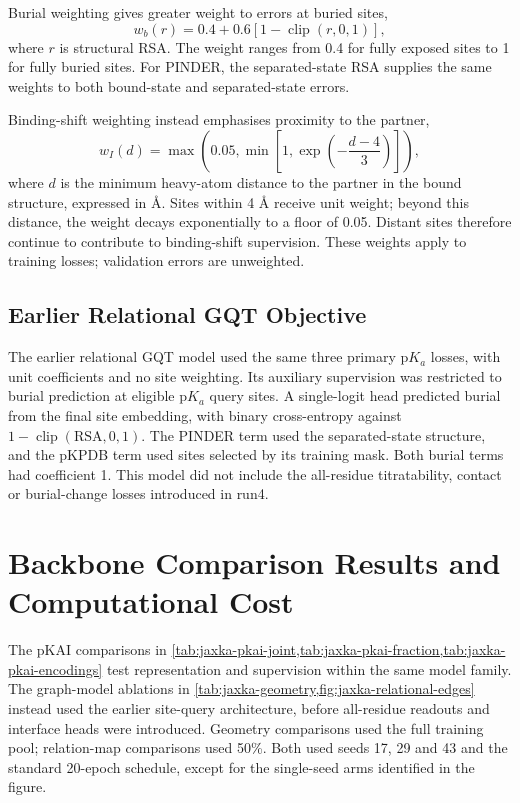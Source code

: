 Burial weighting gives greater weight to errors at buried sites,
\begin{equation}
    w_b(r)=0.4+0.6\left[1-\operatorname{clip}(r,0,1)\right],
    \label{eq:jaxka-pkai-burial-weight}
\end{equation}
where $r$ is structural RSA. The weight ranges from 0.4 for fully exposed sites to 1 for fully buried sites. For PINDER, the separated-state RSA supplies the same weights to both bound-state and separated-state errors.

Binding-shift weighting instead emphasises proximity to the partner,
\begin{equation}
    w_I(d)=\max\!\left(0.05,
    \min\!\left[1,\exp\!\left(-\frac{d-4}{3}\right)\right]\right),
    \label{eq:jaxka-pkai-interface-weight}
\end{equation}
where $d$ is the minimum heavy-atom distance to the partner in the bound structure, expressed in \AA{}. Sites within 4 \AA{} receive unit weight; beyond this distance, the weight decays exponentially to a floor of 0.05. Distant sites therefore continue to contribute to binding-shift supervision. These weights apply to training losses; validation errors are unweighted.

\subsection{Earlier Relational GQT Objective}
\label{app:jaxka-relational-objective}

The earlier relational GQT model used the same three primary $\mathrm{p}K_a$ losses, with unit coefficients and no site weighting. Its auxiliary supervision was restricted to burial prediction at eligible $\mathrm{p}K_a$ query sites. A single-logit head predicted burial from the final site embedding, with binary cross-entropy against $1-\operatorname{clip}(\mathrm{RSA},0,1)$. The PINDER term used the separated-state structure, and the pKPDB term used sites selected by its training mask. Both burial terms had coefficient 1. This model did not include the all-residue titratability, contact or burial-change losses introduced in run4.

\section{Backbone Comparison Results and Computational Cost}
\label{app:jaxka-backbone-comparisons}

The pKAI comparisons in \cref{tab:jaxka-pkai-joint,tab:jaxka-pkai-fraction,tab:jaxka-pkai-encodings} test representation and supervision within the same model family. The graph-model ablations in \cref{tab:jaxka-geometry,fig:jaxka-relational-edges} instead used the earlier site-query architecture, before all-residue readouts and interface heads were introduced. Geometry comparisons used the full training pool; relation-map comparisons used 50\%. Both used seeds 17, 29 and 43 and the standard 20-epoch schedule, except for the single-seed arms identified in the figure.

